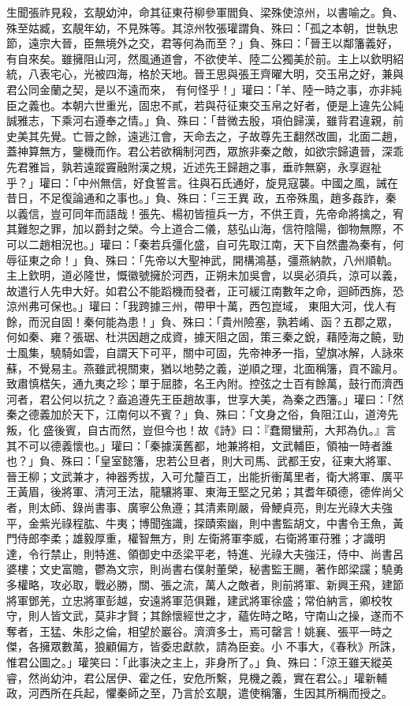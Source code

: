 \begin{pinyinscope}
 生聞張祚見殺，玄靚幼沖，命其征東苻柳參軍閻負、梁殊使涼州，以書喻之。負、殊至姑臧，玄靚年幼，不見殊等。其涼州牧張瓘謂負、殊曰：「孤之本朝，世執忠節，遠宗大晉，臣無境外之交，君等何為而至？」負、殊曰：「晉王以鄰籓義好，有自來矣。雖擁阻山河，然風通道會，不欲使羊、陸二公獨美於前。主上以欽明紹統，八表宅心，光被四海，格於天地。晉王思與張王齊曜大明，交玉帛之好，兼與君公同金蘭之契，是以不遠而來，
 有何怪乎！」瓘曰：「羊、陸一時之事，亦非純臣之義也。本朝六世重光，固忠不貳，若與苻征東交玉帛之好者，便是上違先公純誠雅志，下乘河右遵奉之情。」負、殊曰：「昔微去殷，項伯歸漢，雖背君違親，前史美其先覺。亡晉之餘，遠逃江會，天命去之，子故尊先王翻然改圖，北面二趙，蓋神算無方，鑒機而作。君公若欲稱制河西，眾旅非秦之敵，如欲宗歸遺晉，深乖先君雅旨，孰若遠蹤竇融附漢之規，近述先王歸趙之事，垂祚無窮，永享遐祉乎？」瓘曰：「中州無信，好食誓言。往與石氏通好，旋見寇襲。中國之風，誡在昔日，不足復論通和之事也。」負、殊曰：「三王異
 政，五帝殊風，趙多姦詐，秦以義信，豈可同年而語哉！張先、楊初皆擅兵一方，不供王貢，先帝命將擒之，宥其難恕之罪，加以爵封之榮。今上道合二儀，慈弘山海，信符陰陽，御物無際，不可以二趙相況也。」瓘曰：「秦若兵彊化盛，自可先取江南，天下自然盡為秦有，何辱征東之命！」負、殊曰：「先帝以大聖神武，開構鴻基，彊燕納款，八州順軌。主上欽明，道必隆世，慨徽號擁於河西，正朔未加吳會，以吳必須兵，涼可以義，故遣行人先申大好。如君公不能蹈機而發者，正可緩江南數年之命，迴師西旆，恐涼州弗可保也。」瓘曰：「我跨據三州，帶甲十萬，西包崑域，
 東阻大河，伐人有餘，而況自固！秦何能為患！」負、殊曰：「貴州險塞，孰若崤、函？五郡之眾，何如秦、雍？張琚、杜洪因趙之成資，據天阻之固，策三秦之銳，藉陸海之饒，勁士風集，驍騎如雲，自謂天下可平，關中可固，先帝神矛一指，望旗冰解，人詠來蘇，不覺易主。燕雖武視關東，猶以地勢之義，逆順之理，北面稱籓，貢不踰月。致肅慎楛矢，通九夷之珍；單于屈膝，名王內附。控弦之士百有餘萬，鼓行而濟西河者，君公何以抗之？盍追遵先王臣趙故事，世享大美，為秦之西籓。」瓘曰：「然秦之德義加於天下，江南何以不賓？」負、殊曰：「文身之俗，負阻江山，道洿先叛，化
 盛後賓，自古而然，豈但今也！故《詩》曰：『蠢爾蠻荊，大邦為仇。』言其不可以德義懷也。」瓘曰：「秦據漢舊都，地兼將相，文武輔臣，領袖一時者誰也？」負、殊曰：「皇室懿籓，忠若公旦者，則大司馬、武都王安，征東大將軍、晉王柳；文武兼才，神器秀拔，入可允釐百工，出能折衝萬里者，衛大將軍、廣平王黃眉，後將軍、清河王法，龍驤將軍、東海王堅之兄弟；其耆年碩德，德侔尚父者，則太師、錄尚書事、廣寧公魚遵；其清素剛嚴，骨鯁貞亮，則左光祿大夫強平，金紫光祿程肱、牛夷；博聞強識，探賾索幽，則中書監胡文，中書令王魚，黃門侍郎李柔；雄毅厚重，權智無方，則
 左衛將軍李威，右衛將軍苻雅；才識明達，令行禁止，則特進、領御史中丞梁平老，特進、光祿大夫強汪，侍中、尚書呂婆樓；文史富贍，鬱為文宗，則尚書右僕射董榮，秘書監王颺，著作郎梁讜；驍勇多權略，攻必取，戰必勝，關、張之流，萬人之敵者，則前將軍、新興王飛，建節將軍鄧羌，立忠將軍彭越，安遠將軍范俱難，建武將軍徐盛；常伯納言，卿校牧守，則人皆文武，莫非才賢；其餘懷經世之才，蘊佐時之略，守南山之操，遂而不奪者，王猛、朱肜之倫，相望於巖谷。濟濟多士，焉可罄言！姚襄、張平一時之傑，各擁眾數萬，狼顧偏方，皆委忠獻款，請為臣妾。小
 不事大，《春秋》所誅，惟君公圖之。」瓘笑曰：「此事決之主上，非身所了。」負、殊曰：「涼王雖天縱英睿，然尚幼沖，君公居伊、霍之任，安危所繫，見機之義，實在君公。」瓘新輔政，河西所在兵起，懼秦師之至，乃言於玄靚，遣使稱籓，生因其所稱而授之。




\end{pinyinscope}
